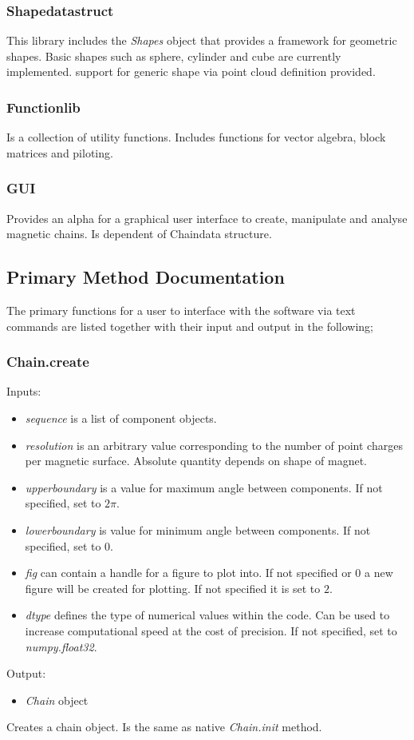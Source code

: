 \subsubsection{Shape\textunderscore data\textunderscore struct} 
This library includes the \textit{Shapes} object that provides a framework for geometric shapes. Basic shapes such as sphere, cylinder and cube are currently implemented. support for generic shape via point cloud definition provided.


\subsubsection{Function\textunderscore lib} 
Is a collection of utility functions. Includes functions for vector algebra, block matrices and piloting.

\subsubsection{GUI}
Provides an alpha for a graphical user interface to create, manipulate and analyse magnetic chains. Is dependent of Chain\textunderscore data structure.

\subsection{Primary Method Documentation}
The primary functions for a user to interface with the software via text commands are listed together with their input and output in the following;
\subsubsection{Chain.create}
Inputs:
\begin{itemize}
    \item \textit{sequence} is a list of component objects.
    \item \textit{resolution} is an arbitrary value corresponding to the number of point charges per magnetic surface. Absolute quantity depends on shape of magnet. 
    \item \textit{upper\textunderscore boundary} is a value for maximum angle between components. If not specified, set to $2\pi$.
    \item \textit{lower\textunderscore boundary} is value for minimum angle between components. If not specified, set to 0.
    \item \textit{fig} can contain a handle for a figure to plot into. If not specified or $0$ a new figure will be created for plotting. If not specified it is set to $2$.
    \item \textit{dtype} defines the type of numerical values within the code. Can be used to increase computational speed at the cost of precision. If not specified, set to \textit{numpy.float32}.
\end{itemize}
Output:
\begin{itemize}
    \item \textit{Chain} object
\end{itemize}
Creates a chain object. Is the same as native \textit{Chain.\textunderscore \textunderscore init\textunderscore \textunderscore } method.

